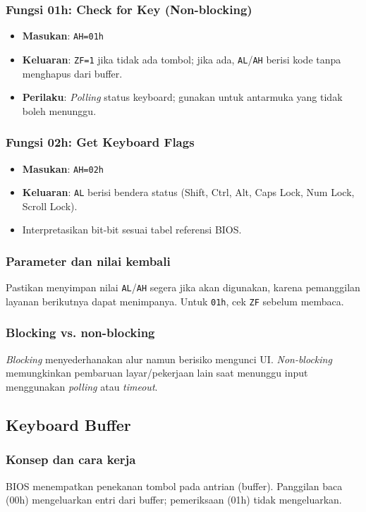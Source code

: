 \documentclass[../main.tex]{subfiles}
\begin{document}
\subsubsection{Fungsi 01h: Check for Key (Non-blocking)}
\begin{itemize}
  \item \textbf{Masukan}: \texttt{AH=01h}
  \item \textbf{Keluaran}: \texttt{ZF=1} jika tidak ada tombol; jika ada, \texttt{AL}/\texttt{AH} berisi kode tanpa menghapus dari buffer.
  \item \textbf{Perilaku}: \textit{Polling} status keyboard; gunakan untuk antarmuka yang tidak boleh menunggu.
\end{itemize}

\subsubsection{Fungsi 02h: Get Keyboard Flags}
\begin{itemize}
  \item \textbf{Masukan}: \texttt{AH=02h}
  \item \textbf{Keluaran}: \texttt{AL} berisi bendera status (Shift, Ctrl, Alt, Caps Lock, Num Lock, Scroll Lock).
  \item Interpretasikan bit-bit sesuai tabel referensi BIOS.
\end{itemize}

\subsubsection{Parameter dan nilai kembali}
Pastikan menyimpan nilai \texttt{AL}/\texttt{AH} segera jika akan digunakan, karena pemanggilan layanan berikutnya dapat menimpanya. Untuk \texttt{01h}, cek \texttt{ZF} sebelum membaca.

\subsubsection{Blocking vs. non-blocking}
\textit{Blocking} menyederhanakan alur namun berisiko mengunci UI. \textit{Non-blocking} memungkinkan pembaruan layar/pekerjaan lain saat menunggu input menggunakan \textit{polling} atau \textit{timeout}.

\subsection{Keyboard Buffer}
\subsubsection{Konsep dan cara kerja}
BIOS menempatkan penekanan tombol pada antrian (buffer). Panggilan baca (00h) mengeluarkan entri dari buffer; pemeriksaan (01h) tidak mengeluarkan.
\end{document}
